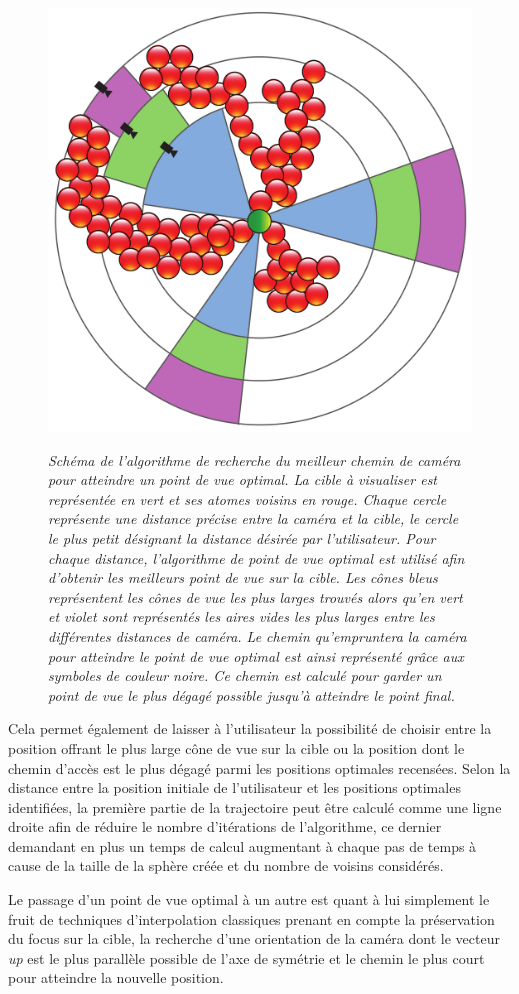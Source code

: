 \begin{figure}[h]
  \centering
  {\includegraphics[width=.5\linewidth]{./figures/ch3/optimal_pov_camera_path}}
    \caption{{\it Schéma de l'algorithme de recherche du meilleur chemin de caméra pour atteindre un point de vue optimal. La cible à visualiser est représentée en vert et ses atomes voisins en rouge. Chaque cercle représente une distance précise entre la caméra et la cible, le cercle le plus petit désignant la distance désirée par l'utilisateur. Pour chaque distance, l'algorithme de point de vue optimal est utilisé afin d'obtenir les meilleurs point de vue sur la cible. Les cônes bleus représentent les cônes de vue les plus larges trouvés alors qu'en vert et violet sont représentés les aires vides les plus larges entre les différentes distances de caméra. Le chemin qu'empruntera la caméra pour atteindre le point de vue optimal est ainsi représenté grâce aux symboles de couleur noire. Ce chemin est calculé pour garder un point de vue le plus dégagé possible jusqu'à atteindre le point final.}}
  \label{Fig:optimal_pov_camera_path}
  \hspace{0.2cm}
\end{figure}

Cela permet également de laisser à l'utilisateur la possibilité de choisir entre la position offrant le plus large cône de vue sur la cible ou la position dont le chemin d'accès est le plus dégagé parmi les positions optimales recensées. Selon la distance entre la position initiale de l'utilisateur et les positions optimales identifiées, la première partie de la trajectoire peut être calculé comme une ligne droite afin de réduire le nombre d'itérations de l'algorithme, ce dernier demandant en plus un temps de calcul augmentant à chaque pas de temps à cause de la taille de la sphère créée et du nombre de voisins considérés.

Le passage d'un point de vue optimal à un autre est quant à lui simplement le fruit de techniques d'interpolation classiques prenant en compte la préservation du focus sur la cible, la recherche d'une orientation de la caméra dont le vecteur \textit{up} est le plus parallèle possible de l'axe de symétrie et le chemin le plus court pour atteindre la nouvelle position.

